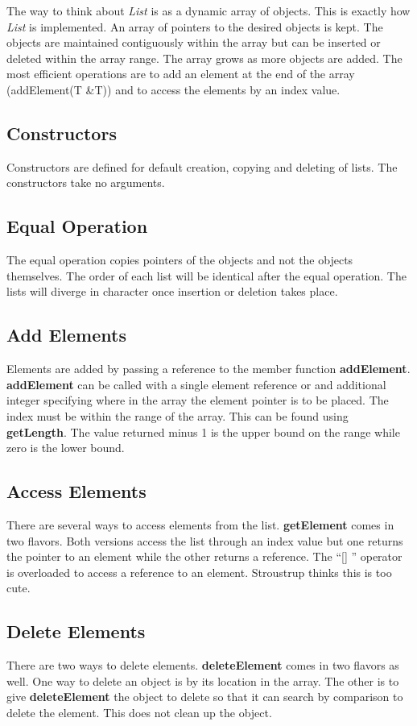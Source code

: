 The way to think about {\em List} is as a dynamic array of objects.  This is exactly how {\em List} is implemented.  An array of pointers to the desired objects is kept.  The objects are maintained contiguously within the array but can be inserted or deleted within the array range.  The array grows as more objects are added.  The most efficient operations are to add an element at the end of the array (addElement(T \&T)) and to access the elements by an index value.

\subsection{Constructors}
Constructors are defined for default creation, copying and deleting of lists.  The constructors take no arguments.

\subsection{Equal Operation}
The equal operation copies pointers of the objects and not the objects themselves.  The order
of each list will be identical after the equal operation.  The lists will diverge in character once insertion or deletion takes place.

\subsection{Add Elements}
Elements are added by passing a reference to the member function {\bf addElement}.  {\bf addElement} can be called with a single element reference or and additional integer specifying where in the array the element pointer is to be placed.  The index must be within the range of the array.  This can be found using {\bf getLength}.  The value returned minus 1 is the upper bound on the range while zero is the lower bound.

\subsection{Access Elements}
There are several ways to access elements from the list.  {\bf getElement} comes in two flavors.  Both versions access the list through an index value but one returns the pointer to an element while the other returns a reference.  The ``[] '' operator is overloaded to access a reference to an element.  Stroustrup thinks this is too cute.

\subsection{Delete Elements}
There are two ways to delete elements.  {\bf deleteElement} comes in two flavors as well.  One way to delete an object is by its location in the array.  The other is to give {\bf deleteElement} the object to delete so that it can search by comparison to delete the element.  This does not clean up the object.

